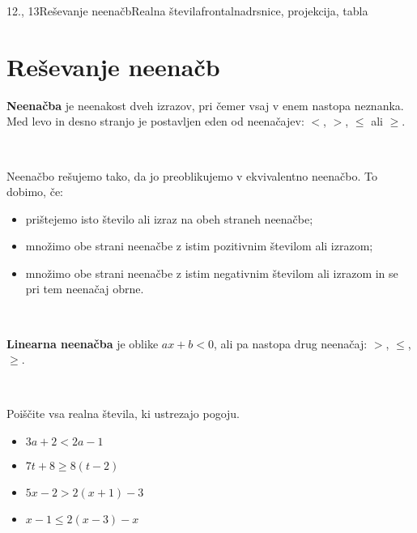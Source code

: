 \begin{priprava}{12., 13}{}{Reševanje neenačb}{Realna števila}{frontalna}{drsnice, projekcija, tabla}
    
    \section{Reševanje neenačb}

        

                \textbf{Neenačba} je neenakost dveh izrazov, pri čemer vsaj v enem nastopa neznanka.
                Med levo in desno stranjo je postavljen eden od neenačajev: $<$, $>$, $\leq$ ali $\geq$.

                ~

                Neenačbo rešujemo tako, da jo preoblikujemo v ekvivalentno neenačbo. To dobimo, če:
                \begin{itemize}
                    \item prištejemo isto število ali izraz na obeh straneh neenačbe;
                    \item množimo obe strani neenačbe z istim pozitivnim številom ali izrazom;
                    \item množimo obe strani neenačbe z istim negativnim številom ali izrazom in se pri tem neenačaj obrne.
                \end{itemize}
            
                ~
            
                \textbf{Linearna neenačba} je oblike $ax+b<0$, ali pa nastopa drug neenačaj: $>$, $\leq$, $\geq$.
            
        
~~~\\



        
                
                    \begin{naloga}
                        Poiščite vsa realna števila, ki ustrezajo pogoju.
                        \begin{itemize}
                                \item $3a+2<2a-1$ 
                                \item $7t+8\geq 8(t-2)$ 
                                \item $5x-2>2(x+1)-3$ 
                                \item $x-1\leq 2(x-3)-x$ 
                        \end{itemize}
                    \end{naloga}
                

\end{priprava}
